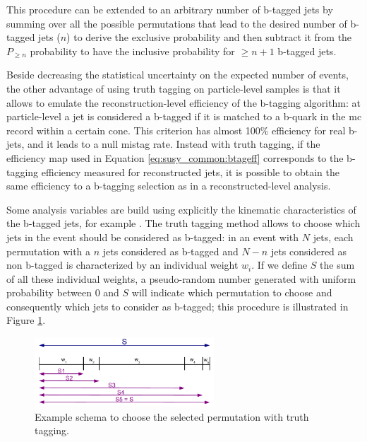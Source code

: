 \noindent This procedure can be extended to an arbitrary number of b-tagged jets by summing over all the possible permutations that lead to the desired number of b-tagged jets ($n$) to derive the exclusive probability and then subtract it from the $P_{\geq n}$ probability to have the inclusive probability for $\geq n+1$ b-tagged jets.
 
Beside decreasing the statistical uncertainty on the expected number of events, the other advantage of using truth tagging on particle-level samples is that it allows to emulate the reconstruction-level efficiency of the b-tagging algorithm: 
at particle-level a jet is considered a b-tagged if it is matched to a b-quark in the \gls{mc} record within a certain cone. This criterion has 
almost 100\% efficiency for real b-jets, and it leads to a null mistag rate. Instead with truth tagging, if the efficiency map used in Equation \ref{eq:susy_common:btageff} corresponds to the b-tagging efficiency measured for reconstructed jets, 
it is possible to obtain the same efficiency to a b-tagging selection as in a reconstructed-level analysis. 

Some analysis variables are build using explicitly the kinematic characteristics of the b-tagged jets, for example \mtb. The truth tagging method allows to choose which jets in the event should be considered as b-tagged: in an event with $N$ jets, each permutation with a $n$ jets considered as b-tagged and $N-n$ jets considered as non b-tagged is characterized by an individual weight $w_i$. If we define $S$ the sum of all these individual weights, a pseudo-random number generated with uniform probability between 0 and $S$ will indicate which permutation to choose and consequently which jets to consider as b-tagged; this procedure is illustrated in Figure \ref{fig:susy_common_trf_perm}. 

\begin{figure}[h]
\centering 
\includegraphics[width=0.6\textwidth]{figures/susy_common/trf_perm}
\caption{Example schema to choose the selected permutation with truth tagging.}\label{fig:susy_common_trf_perm}
\end{figure}


